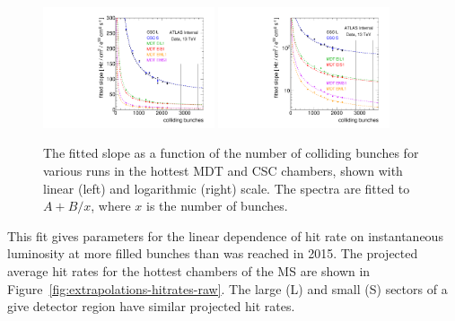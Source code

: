 \begin{figure}
  \begin{center}
    \includegraphics[width=0.45\textwidth]{./figures/slope_vs_bunches_raw_lin.pdf}
    \includegraphics[width=0.45\textwidth]{./figures/slope_vs_bunches_raw_log.pdf}
    \caption{The fitted slope as a function of the number of colliding bunches for various runs in the hottest MDT and CSC chambers, shown with linear (left) and logarithmic (right) scale. The spectra are fitted to $A + B/x$, where $x$ is the number of bunches.}
    \label{fig:extrapolations-slope-vs-bunches-raw}
  \end{center}
\end{figure}

This fit gives parameters for the linear dependence of hit rate on instantaneous luminosity at more filled bunches than was reached in 2015. The projected average hit rates for the hottest chambers of the MS are shown in Figure~\ref{fig:extrapolations-hitrates-raw}. The large (L) and small (S) sectors of a give detector region have similar projected hit rates.

